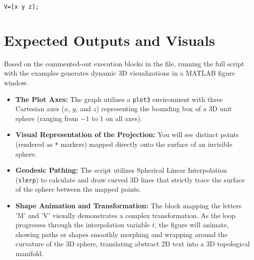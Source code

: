 \begin{lstlisting}[style=matlabstyle]
V=[x y z];
\end{lstlisting}

\section{Expected Outputs and Visuals}

Based on the commented-out execution blocks in the file, running the full script with the examples generates dynamic 3D visualizations in a MATLAB figure window. 

\begin{itemize}
    \item \textbf{The Plot Axes:} The graph utilizes a \texttt{plot3} environment with three Cartesian axes ($x$, $y$, and $z$) representing the bounding box of a 3D unit sphere (ranging from $-1$ to $1$ on all axes).
    \item \textbf{Visual Representation of the Projection:} You will see distinct points (rendered as \texttt{*} markers) mapped directly onto the surface of an invisible sphere. 
    \item \textbf{Geodesic Pathing:} The script utilizes Spherical Linear Interpolation (\texttt{slerp}) to calculate and draw curved 3D lines that strictly trace the surface of the sphere between the mapped points.
    \item \textbf{Shape Animation and Transformation:} The block mapping the letters 'M' and 'V' visually demonstrates a complex transformation. As the loop progresses through the interpolation variable $t$, the figure will animate, showing paths or shapes smoothly morphing and wrapping around the curvature of the 3D sphere, translating abstract 2D text into a 3D topological manifold.
\end{itemize}
